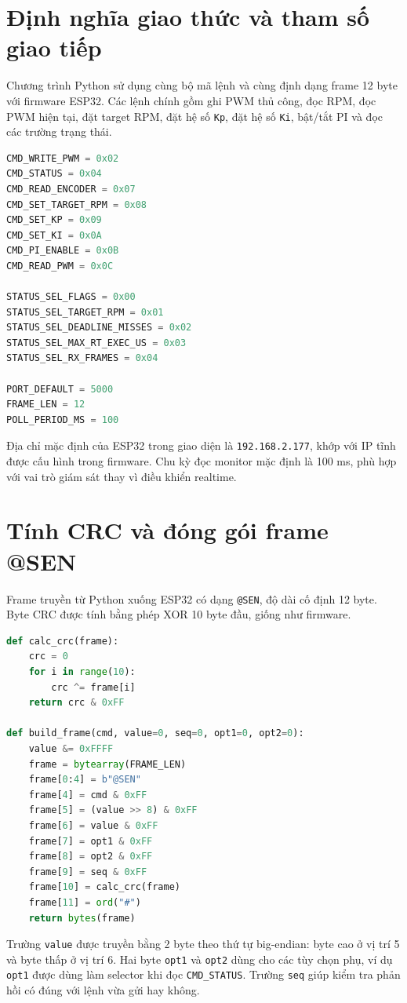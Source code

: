 \documentclass[12pt,a4paper]{report}
\begin{document}
\section{Định nghĩa giao thức và tham số giao tiếp}

Chương trình Python sử dụng cùng bộ mã lệnh và cùng định dạng frame 12 byte với firmware ESP32. Các lệnh chính gồm ghi PWM thủ công, đọc RPM, đọc PWM hiện tại, đặt target RPM, đặt hệ số \texttt{Kp}, đặt hệ số \texttt{Ki}, bật/tắt PI và đọc các trường trạng thái.

\begin{lstlisting}[language=Python]
CMD_WRITE_PWM = 0x02
CMD_STATUS = 0x04
CMD_READ_ENCODER = 0x07
CMD_SET_TARGET_RPM = 0x08
CMD_SET_KP = 0x09
CMD_SET_KI = 0x0A
CMD_PI_ENABLE = 0x0B
CMD_READ_PWM = 0x0C

STATUS_SEL_FLAGS = 0x00
STATUS_SEL_TARGET_RPM = 0x01
STATUS_SEL_DEADLINE_MISSES = 0x02
STATUS_SEL_MAX_RT_EXEC_US = 0x03
STATUS_SEL_RX_FRAMES = 0x04

PORT_DEFAULT = 5000
FRAME_LEN = 12
POLL_PERIOD_MS = 100
\end{lstlisting}

Địa chỉ mặc định của ESP32 trong giao diện là \texttt{192.168.2.177}, khớp với IP tĩnh được cấu hình trong firmware. Chu kỳ đọc monitor mặc định là 100 ms, phù hợp với vai trò giám sát thay vì điều khiển realtime.

\section{Tính CRC và đóng gói frame @SEN}

Frame truyền từ Python xuống ESP32 có dạng \texttt{@SEN}, độ dài cố định 12 byte. Byte CRC được tính bằng phép XOR 10 byte đầu, giống như firmware.

\begin{lstlisting}[language=Python]
def calc_crc(frame):
    crc = 0
    for i in range(10):
        crc ^= frame[i]
    return crc & 0xFF

def build_frame(cmd, value=0, seq=0, opt1=0, opt2=0):
    value &= 0xFFFF
    frame = bytearray(FRAME_LEN)
    frame[0:4] = b"@SEN"
    frame[4] = cmd & 0xFF
    frame[5] = (value >> 8) & 0xFF
    frame[6] = value & 0xFF
    frame[7] = opt1 & 0xFF
    frame[8] = opt2 & 0xFF
    frame[9] = seq & 0xFF
    frame[10] = calc_crc(frame)
    frame[11] = ord("#")
    return bytes(frame)
\end{lstlisting}

Trường \texttt{value} được truyền bằng 2 byte theo thứ tự big-endian: byte cao ở vị trí 5 và byte thấp ở vị trí 6. Hai byte \texttt{opt1} và \texttt{opt2} dùng cho các tùy chọn phụ, ví dụ \texttt{opt1} được dùng làm selector khi đọc \texttt{CMD\_STATUS}. Trường \texttt{seq} giúp kiểm tra phản hồi có đúng với lệnh vừa gửi hay không.
\end{document}
